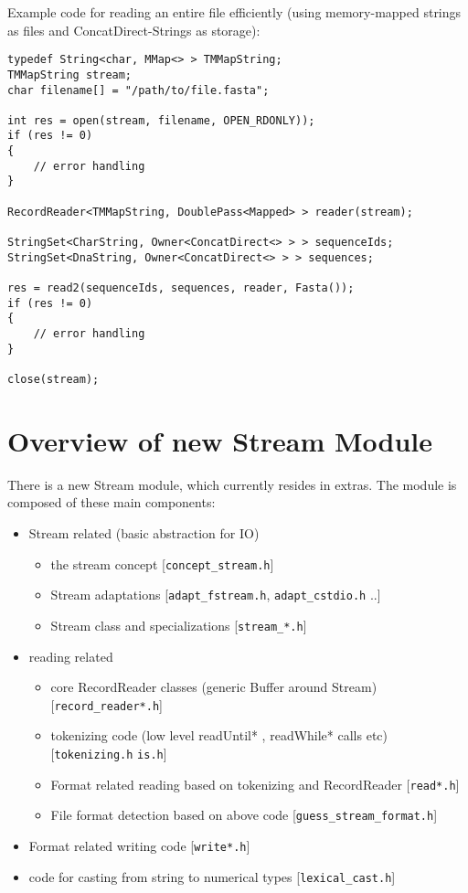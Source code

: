 \documentclass[a4paper,12pt]{scrartcl}
\begin{document}
Example code for reading an entire file efficiently (using 
memory-mapped strings as files and ConcatDirect-Strings as storage):
\begin{lstlisting}
typedef String<char, MMap<> > TMMapString;
TMMapString stream;
char filename[] = "/path/to/file.fasta";

int res = open(stream, filename, OPEN_RDONLY));
if (res != 0)
{
	// error handling
}

RecordReader<TMMapString, DoublePass<Mapped> > reader(stream);

StringSet<CharString, Owner<ConcatDirect<> > > sequenceIds;
StringSet<DnaString, Owner<ConcatDirect<> > > sequences;

res = read2(sequenceIds, sequences, reader, Fasta());
if (res != 0)
{
	// error handling
}

close(stream);
\end{lstlisting}
% 
% 
% 


\section{Overview of new Stream Module}

There is a new Stream module, which currently resides in extras. The module 
is composed of these main components:
\begin{itemize}
\item Stream related (basic abstraction for IO)
\begin{itemize}
\item the stream concept [\verb#concept_stream.h#]
\item Stream adaptations [\verb#adapt_fstream.h#, \verb#adapt_cstdio.h# ..]
\item Stream class and specializations [\verb#stream_*.h#]
\end{itemize}
\item reading related
\begin{itemize}
\item core RecordReader classes (generic Buffer around Stream) [\verb#record_reader*.h#]
\item tokenizing code (low level readUntil* , readWhile* calls etc) 
[\verb#tokenizing.h# \verb#is.h#]
\item Format related reading based on tokenizing and RecordReader [\verb#read*.h#]
\item File format detection based on above code [\verb#guess_stream_format.h#]
\end{itemize}
\item Format related writing code [\verb#write*.h#]
\item code for casting from string to numerical types [\verb#lexical_cast.h#]
\end{itemize}
\end{document}
